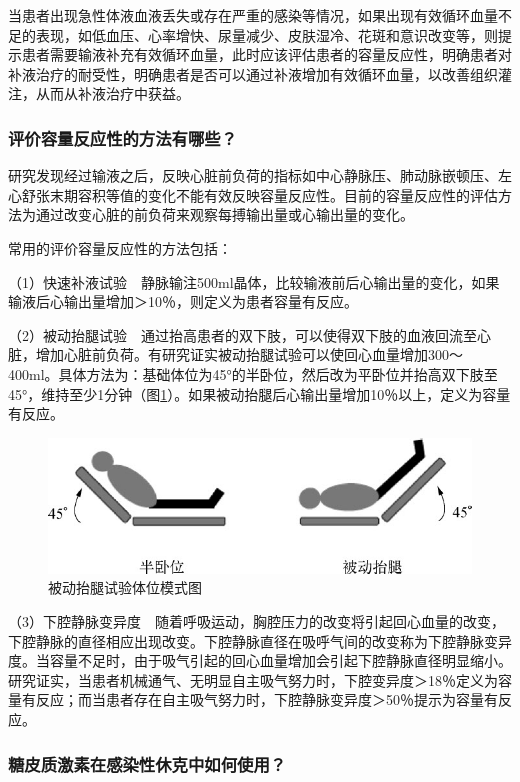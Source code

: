 当患者出现急性体液血液丢失或存在严重的感染等情况，如果出现有效循环血量不足的表现，如低血压、心率增快、尿量减少、皮肤湿冷、花斑和意识改变等，则提示患者需要输液补充有效循环血量，此时应该评估患者的容量反应性，明确患者对补液治疗的耐受性，明确患者是否可以通过补液增加有效循环血量，以改善组织灌注，从而从补液治疗中获益。

\subsubsection{评价容量反应性的方法有哪些？}

研究发现经过输液之后，反映心脏前负荷的指标如中心静脉压、肺动脉嵌顿压、左心舒张末期容积等值的变化不能有效反映容量反应性。目前的容量反应性的评估方法为通过改变心脏的前负荷来观察每搏输出量或心输出量的变化。

常用的评价容量反应性的方法包括：

（1）快速补液试验　静脉输注500ml晶体，比较输液前后心输出量的变化，如果输液后心输出量增加＞10％，则定义为患者容量有反应。

（2）被动抬腿试验　通过抬高患者的双下肢，可以使得双下肢的血液回流至心脏，增加心脏前负荷。有研究证实被动抬腿试验可以使回心血量增加300～400ml。具体方法为：基础体位为45°的半卧位，然后改为平卧位并抬高双下肢至45°，维持至少1分钟（图\ref{fig2-3}）。如果被动抬腿后心输出量增加10％以上，定义为容量有反应。

\begin{figure}[!htbp]
 \centering
 \includegraphics{./images/Image00021.jpg}
 \captionsetup{justification=centering}
 \caption{被动抬腿试验体位模式图}
 \label{fig2-3}
  \end{figure} 

（3）下腔静脉变异度　随着呼吸运动，胸腔压力的改变将引起回心血量的改变，下腔静脉的直径相应出现改变。下腔静脉直径在吸呼气间的改变称为下腔静脉变异度。当容量不足时，由于吸气引起的回心血量增加会引起下腔静脉直径明显缩小。研究证实，当患者机械通气、无明显自主吸气努力时，下腔变异度＞18％定义为容量有反应；而当患者存在自主吸气努力时，下腔静脉变异度＞50％提示为容量有反应。

\subsubsection{糖皮质激素在感染性休克中如何使用？}

